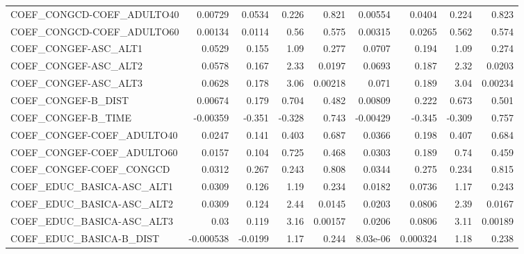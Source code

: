 \begin{tabular}{lrrrrrrrr}
COEF\_CONGCD-COEF\_ADULTO40         &     0.00729 &       0.0534 &   0.226 &    0.821 &    0.00554 &      0.0404 &        0.224 &         0.823 \\
COEF\_CONGCD-COEF\_ADULTO60         &     0.00134 &       0.0114 &    0.56 &    0.575 &    0.00315 &      0.0265 &        0.562 &         0.574 \\
COEF\_CONGEF-ASC\_ALT1              &      0.0529 &        0.155 &    1.09 &    0.277 &     0.0707 &       0.194 &         1.09 &         0.274 \\
COEF\_CONGEF-ASC\_ALT2              &      0.0578 &        0.167 &    2.33 &   0.0197 &     0.0693 &       0.187 &         2.32 &        0.0203 \\
COEF\_CONGEF-ASC\_ALT3              &      0.0628 &        0.178 &    3.06 &  0.00218 &      0.071 &       0.189 &         3.04 &       0.00234 \\
COEF\_CONGEF-B\_DIST                &     0.00674 &        0.179 &   0.704 &    0.482 &    0.00809 &       0.222 &        0.673 &         0.501 \\
COEF\_CONGEF-B\_TIME                &    -0.00359 &       -0.351 &  -0.328 &    0.743 &   -0.00429 &      -0.345 &       -0.309 &         0.757 \\
COEF\_CONGEF-COEF\_ADULTO40         &      0.0247 &        0.141 &   0.403 &    0.687 &     0.0366 &       0.198 &        0.407 &         0.684 \\
COEF\_CONGEF-COEF\_ADULTO60         &      0.0157 &        0.104 &   0.725 &    0.468 &     0.0303 &       0.189 &         0.74 &         0.459 \\
COEF\_CONGEF-COEF\_CONGCD           &      0.0312 &        0.267 &   0.243 &    0.808 &     0.0344 &       0.275 &        0.234 &         0.815 \\
COEF\_EDUC\_BASICA-ASC\_ALT1         &      0.0309 &        0.126 &    1.19 &    0.234 &     0.0182 &      0.0736 &         1.17 &         0.243 \\
COEF\_EDUC\_BASICA-ASC\_ALT2         &      0.0309 &        0.124 &    2.44 &   0.0145 &     0.0203 &      0.0806 &         2.39 &        0.0167 \\
COEF\_EDUC\_BASICA-ASC\_ALT3         &        0.03 &        0.119 &    3.16 &  0.00157 &     0.0206 &      0.0806 &         3.11 &       0.00189 \\
COEF\_EDUC\_BASICA-B\_DIST           &   -0.000538 &      -0.0199 &    1.17 &    0.244 &   8.03e-06 &    0.000324 &         1.18 &         0.238 \\

\end{tabular}
